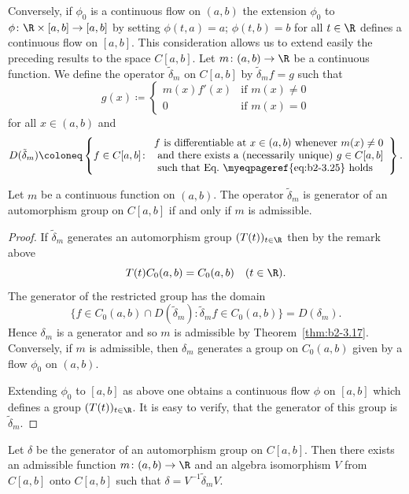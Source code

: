 Conversely, if\/ $\phi_{0}$ is a continuous flow on $(a,b)$ the extension $\phi_{0}$ to $\phi \colon \R \times [a,b] \to [a,b]$ by setting $\phi(t,a) = a$; $\phi(t,b) = b$ for all $t \in \R$ defines a continuous flow on $[a,b]$.
This consideration allows us to extend easily the preceding results to the space $C[a,b]$.
Let $m \colon (a,b) \to \R$ be a continuous function.
We define the operator $\widetilde{\delta}_{m}$ on $C[a,b]$ by $\widetilde{\delta}_{m}f = g$ such that
\begin{equation}\label{eq:b2-3.25}
g(x) \coloneq \begin{cases}
    m(x)f'(x) & \text{if } m(x) \neq 0 \\
    0 & \text{if } m(x) = 0
\end{cases}
\end{equation}
for all $x \in (a,b)$ and 
\[
D(\tilde{\delta}_{m}) \coloneq \left\{ f \in C[a,b] \colon 
\begin{array}{l}
f \text{ is differentiable at } x \in (a,b) \text{ whenever } m(x) \neq 0 \\ 
\text{ and there exists a (necessarily unique) } g \in C[a,b] \\
\text{ such that Eq.~\myeqpageref{eq:b2-3.25} holds} 
\end{array} \right\}.
\]
\begin{theorem}\label{thm:b2-3.26}
%
Let $m$ be a continuous function on $(a,b)$.
The operator $\tilde{\delta}_{m}$ is generator of an automorphism group on $C[a,b]$ if and only if\/ $m$ is admissible.
\end{theorem}
\begin{proof}
If\/ $\tilde{\delta}_{m}$ generates an automorphism group $(T(t))_{t \in \R}$ then by the remark above 
%
\[
	T(t)C_{0}(a,b) = C_{0}(a,b) \quad (t \in \R) .
\]
%
The generator of the restricted group has the domain 
%
\[
	\{ f \in C_{0}(a,b) \cap D(\tilde{\delta}_{m}) 
		\colon \tilde{\delta}_{m}f \in C_{0}(a,b) \} = D(\delta_{m}) .
\]
%
Hence $\delta_{m}$ is a generator and so $m$ is admissible by Theorem~\ref{thm:b2-3.17}.
Conversely, if\/ $m$ is admissible, then $\delta_{m}$ generates a group on $C_{0}(a,b)$ given by a flow $\phi_{0}$ on $(a,b)$.

Extending $\phi_{0}$ to $[a,b]$ as above one obtains a continuous flow $\phi$ on $[a,b]$ which defines a group $(T(t))_{t \in \R}$.
It is easy to verify, that the generator of this group is $\tilde{\delta}_{m}$.
\end{proof}
\begin{theorem}\label{thm:b2-3.27}
%
Let $\delta$ be the generator of an automorphism group on $C[a,b]$.
Then there exists an admissible function $m \colon (a,b) \to \R$ and an algebra isomorphism $V$ from $C[a,b]$ onto $C[a,b]$ such that $\delta = V^{-1}\tilde{\delta}_{m}V$.
\end{theorem}
